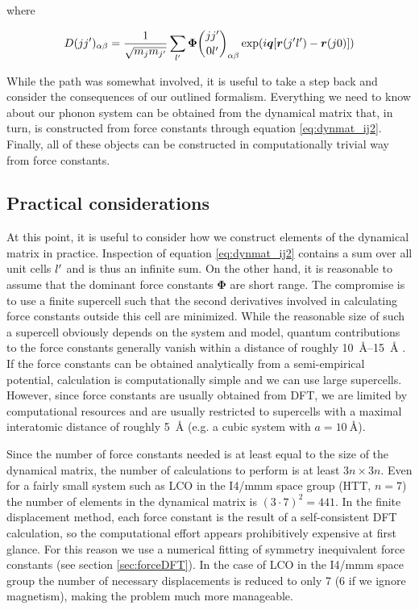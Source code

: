 \noindent where

\begin{equation}
D(j\jp)_{\alpha\beta} = \frac{1}{\sqrt{m_j m_{\jp}}} \sum_{\lp} \fczero _{\alpha\beta} \exp (i\bm{q}[\bm{r}(\jp\lp) - \bm{r}(j0)]) \label{eq:dynmat_ij2}
\end{equation}

\noindent While the path was somewhat involved, it is useful to take a step back and consider the consequences of our outlined formalism. Everything we need to know about our phonon system can be obtained from the dynamical matrix that, in turn,  is constructed from force constants through equation \eqref{eq:dynmat_ij2}. Finally, all of these objects can be constructed in computationally trivial way from force constants.

\subsection{Practical considerations}\label{sec:phononpractical}
At this point, it is useful to consider how we construct elements of the dynamical matrix in practice. Inspection of equation \eqref{eq:dynmat_ij2} contains a sum over all unit cells $l^\prime$ and is thus an infinite sum. On the other hand, it is reasonable to assume that the dominant force constants $\bm{\Phi}$ are short range. The compromise is to use a finite supercell such that the second derivatives involved in calculating force constants outside this cell are minimized. While the reasonable size of such a supercell obviously depends on the system and model, quantum contributions to the force constants generally vanish within a distance of roughly \SIrange{10}{15}{\angstrom} . If the force constants can be obtained analytically from a semi-empirical potential, calculation is computationally simple and we can use large supercells. However, since force constants are usually obtained from DFT, we are limited by computational resources and are usually restricted to supercells with a maximal interatomic distance of roughly \SI{5}{\angstrom} (e.g. a cubic system with $a=\SI{10}{\angstrom}$).

Since the number of force constants needed is at least equal to the size of the dynamical matrix, the number of calculations to perform is at least $3n \times 3n$. Even for a fairly small system such as LCO in the I4/mmm space group (HTT, $n=7$) the number of elements in the dynamical matrix is $(3\cdot 7)^2 = 441$. In the finite displacement method, each force constant is the result of a self-consistent DFT calculation, so the computational effort appears prohibitively expensive at first glance. For this reason we use a numerical fitting of symmetry inequivalent force constants (see section \ref{sec:forceDFT}). In the case of LCO in the I4/mmm space group the number of necessary displacements is reduced to only 7 (6 if we ignore magnetism), making the problem much more manageable.

